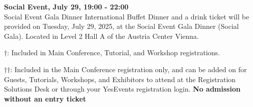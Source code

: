 \textbf{Social Event, July 29, 19:00 - 22:00}\\

Social Event Gala Dinner International Buffet Dinner and a drink ticket will be provided on Tuesday, July 29, 2025, at the Social Event Gala Dinner (Social Gala). Located in Level 2 Hall A of the Austria Center Vienna.

\vspace{4em}

$\dagger$: Included in Main Conference, Tutorial, and Workshop registrations.

$\dagger$$\dagger$: Included in the Main Conference registration only, and can be added on for Guests, Tutorials, Workshops, and Exhibitors to attend at the Registration Solutions Desk or through your YesEvents registration login. \textbf{No admission without an entry ticket}
